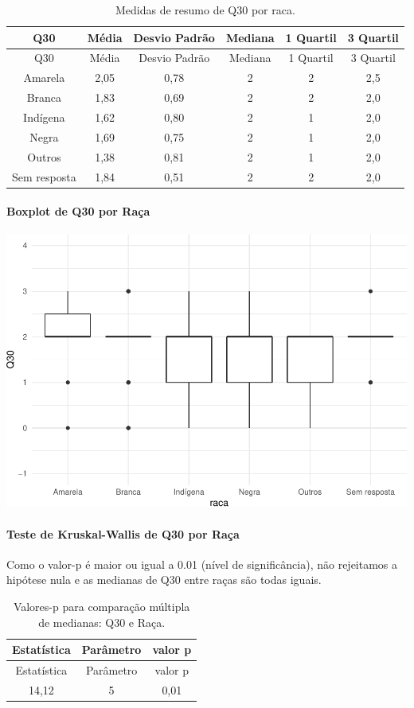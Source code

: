 \documentclass[]{article}
\let\oldparagraph\paragraph
\renewcommand{\paragraph}[1]{\oldparagraph{#1}\mbox{}}
\begin{document}
\begin{longtable}[]{@{}cccccc@{}}
\caption{\label{tab:unnamed-chunk-991}Medidas de resumo de Q30 por raca.}\tabularnewline
\toprule
Q30 & Média & Desvio Padrão & Mediana & 1 Quartil & 3 Quartil\tabularnewline
\midrule
\endfirsthead
\toprule
Q30 & Média & Desvio Padrão & Mediana & 1 Quartil & 3 Quartil\tabularnewline
\midrule
\endhead
Amarela & 2,05 & 0,78 & 2 & 2 & 2,5\tabularnewline
Branca & 1,83 & 0,69 & 2 & 2 & 2,0\tabularnewline
Indígena & 1,62 & 0,80 & 2 & 1 & 2,0\tabularnewline
Negra & 1,69 & 0,75 & 2 & 1 & 2,0\tabularnewline
Outros & 1,38 & 0,81 & 2 & 1 & 2,0\tabularnewline
Sem resposta & 1,84 & 0,51 & 2 & 2 & 2,0\tabularnewline
\bottomrule
\end{longtable}

\hypertarget{boxplot-de-q30-por-rauxe7a}{%
\paragraph{Boxplot de Q30 por Raça}\label{boxplot-de-q30-por-rauxe7a}}

\begin{center}\includegraphics[width=0.75\linewidth]{relatorio_covid19_files/figure-latex/unnamed-chunk-992-1} \end{center}

\hypertarget{teste-de-kruskal-wallis-de-q30-por-rauxe7a}{%
\paragraph{Teste de Kruskal-Wallis de Q30 por Raça}\label{teste-de-kruskal-wallis-de-q30-por-rauxe7a}}

Como o valor-p é maior ou igual a 0.01 (nível de significância), não rejeitamos a hipótese nula e as medianas de Q30 entre raças são todas iguais.

\begin{longtable}[]{@{}ccc@{}}
\caption{\label{tab:unnamed-chunk-994}Valores-p para comparação múltipla de medianas: Q30 e Raça.}\tabularnewline
\toprule
Estatística & Parâmetro & valor p\tabularnewline
\midrule
\endfirsthead
\toprule
Estatística & Parâmetro & valor p\tabularnewline
\midrule
\endhead
14,12 & 5 & 0,01\tabularnewline
\bottomrule
\end{longtable}
\end{document}
